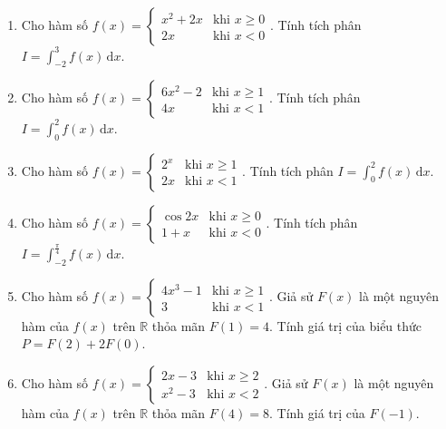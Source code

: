 \documentclass[12pt]{article}
\begin{document}
	\begin{btdo}
		\begin{enumerate}[label=\alph*)]
			\item Cho hàm số $f(x) = \begin{cases} x^2 + 2x & \text{khi } x \ge 0 \\ 2x & \text{khi } x < 0 \end{cases}$. Tính tích phân $I = \displaystyle \int_{-2}^3 f(x)\,\mathrm{d}x$.
			\item Cho hàm số $f(x) = \begin{cases} 6x^2 - 2 & \text{khi } x \ge 1 \\ 4x & \text{khi } x < 1 \end{cases}$. Tính tích phân $I = \displaystyle \int_{0}^2 f(x)\,\mathrm{d}x$.
			\item Cho hàm số $f(x) = \begin{cases} 2^x & \text{khi } x \ge 1 \\ 2x & \text{khi } x < 1 \end{cases}$. Tính tích phân $I = \displaystyle \int_{0}^2 f(x)\,\mathrm{d}x$.
			\item Cho hàm số $f(x) = \begin{cases} \cos 2x & \text{khi } x \ge 0 \\ 1 + x & \text{khi } x < 0 \end{cases}$. Tính tích phân $I = \displaystyle \int_{-2}^{\frac{\pi}{4}} f(x)\,\mathrm{d}x$.
			\item Cho hàm số $f(x) = \begin{cases} 4x^3 - 1 & \text{khi } x \ge 1 \\ 3 & \text{khi } x < 1 \end{cases}$. Giả sử $F(x)$ là một nguyên hàm của $f(x)$ trên $\mathbb{R}$ thỏa mãn $F(1) = 4$. Tính giá trị của biểu thức $P = F(2) + 2F(0)$.
			\item Cho hàm số $f(x) = \begin{cases} 2x - 3 & \text{khi } x \ge 2 \\ x^2 - 3 & \text{khi } x < 2 \end{cases}$. Giả sử $F(x)$ là một nguyên hàm của $f(x)$ trên $\mathbb{R}$ thỏa mãn $F(4) = 8$. Tính giá trị của $F(-1)$.
		\end{enumerate}
	\end{btdo}
	
	\newpage
	
\end{document}
